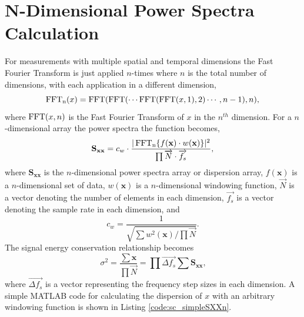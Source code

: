 \section{N-Dimensional Power Spectra Calculation}
For measurements with multiple spatial and temporal dimensions the Fast Fourier Transform is just applied $n$-times where $n$ is the total number of dimensions, with each application in a different dimension,
\begin{equation}
 \operatorname{FFT_n}(x) = \operatorname{FFT}(\operatorname{FFT}(\cdots\operatorname{FFT}(\operatorname{FFT}(x,1),2)\cdots,n-1),n) \textrm{,}
 \label{eqn:04_fftn}
\end{equation}
where $\operatorname{FFT}(x,n)$ is the Fast Fourier Transform of $x$ in the $n^{th}$ dimension.
For a $n$-dimensional array the power spectra the function becomes,
\begin{equation}
 \mathbf{S_{xx}} =c_w\cdot\frac{|\operatorname{FFT_n}\{f(\mathbf{x})\cdot w(\mathbf{x})\}|^2}{\prod{\overrightarrow{N}\cdot\overrightarrow{f_s}}} \textrm{,}
 \label{eqn:04_sxxn}
\end{equation}
where $\mathbf{S_{xx}}$ is the $n$-dimensional power spectra array or dispersion array, $f(\mathbf{x})$ is a $n$-dimensional set of data, $w(\mathbf{x})$ is a $n$-dimensional windowing function, $\overrightarrow{N}$ is a vector denoting the number of elements in each dimension, $\overrightarrow{f_s}$ is a vector denoting the sample rate in each dimension, and
\begin{equation}
 c_w = \frac{1}{\sqrt{\sum w^2(\mathbf{x})/\prod{\overrightarrow{N}}}} \textrm{.}
 \label{eqn:04_windown}
\end{equation}
The signal energy conservation relationship becomes
\begin{equation}
  \sigma^2=\frac{\sum\mathbf{x}}{\prod{\overrightarrow{N}}} = \prod{\overrightarrow{\Delta f_s}}\sum\mathbf{S_{xx}} \textrm{,}
  \label{eqn:04_fftn_energy_conservation}
\end{equation}
where $\overrightarrow{\Delta f_s}$ is a vector representing the frequency step sizes in each dimension.
A simple MATLAB code for calculating the dispersion of $x$ with an arbitrary windowing function is shown in Listing \ref{code:sc_simpleSXXn}.


